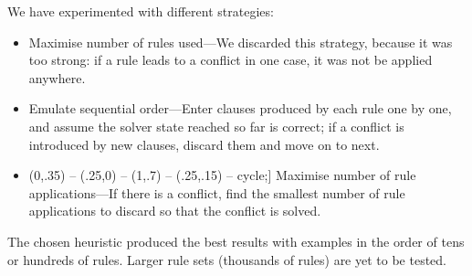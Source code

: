 \documentclass[11pt]{article}
\newcommand{\todo}[1]{{\color{cyan}\textbf{[TODO: }#1\textbf{]}}}
\def\checkmark{\tikz\fill[scale=0.4](0,.35) -- (.25,0) -- (1,.7) -- (.25,.15) -- cycle;}
\begin{document}
We have experimented with different strategies:
\begin{itemize}
\item Maximise
number of rules used---We discarded this strategy, because it was too strong: if a rule leads to a conflict in one case, it was not be applied anywhere.
\item Emulate sequential order---Enter clauses produced by each rule one by one, and assume the solver state reached so far is correct; if a conflict is introduced by new clauses, discard them and move on to next.
\item [\checkmark] Maximise number of rule applications---If there is a conflict, find the smallest number of rule applications to discard so that the conflict is solved.
\end{itemize}


The chosen heuristic produced the best results with examples in the order of tens or hundreds of rules.
Larger rule sets (thousands of rules) are yet to be tested.

\end{document}
